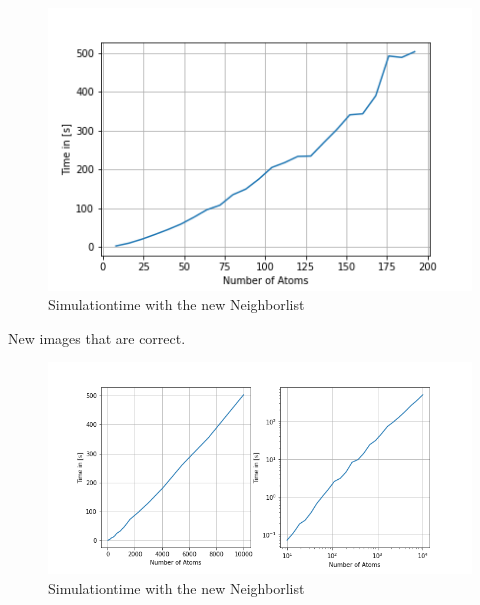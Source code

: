 \begin{figure}[!h]
	\begin{center}
		\includegraphics[scale=1]{Figure/plotAtomTimesNew.png}
	\end{center}
	\caption[Simulationtime with the new Neighborlist]{Simulationtime with the new Neighborlist  }
	\label{PlotAtomTimesCutoff}
\end{figure}
New images that are correct.
\begin{figure}[!h]
	\begin{center}
		\includegraphics[scale=1.25]{Figure/plotAtomTimesMoreData.png}
	\end{center}
	\caption[Simulationtime with the new Neighborlist]{Simulationtime with the new Neighborlist  }
	\label{PlotAtomTimesCutoffNew}
\end{figure}
